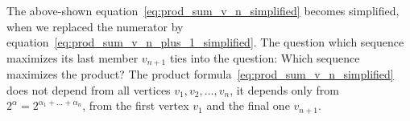 The above-shown equation~\ref{eq:prod_sum_v_n_simplified} becomes simplified, when we replaced the numerator by equation~\ref{eq:prod_sum_v_n_plus_1_simplified}. The question which sequence maximizes its last member $v_{n+1}$ ties into the question: Which sequence maximizes the product? The product formula~\ref{eq:prod_sum_v_n_simplified} does not depend from all vertices $v_1,v_2,\ldots,v_n$, it depends only from $2^\alpha=2^{\alpha_1+\ldots+\alpha_n}$, from the first vertex $v_1$ and the final one $v_{n+1}$.

